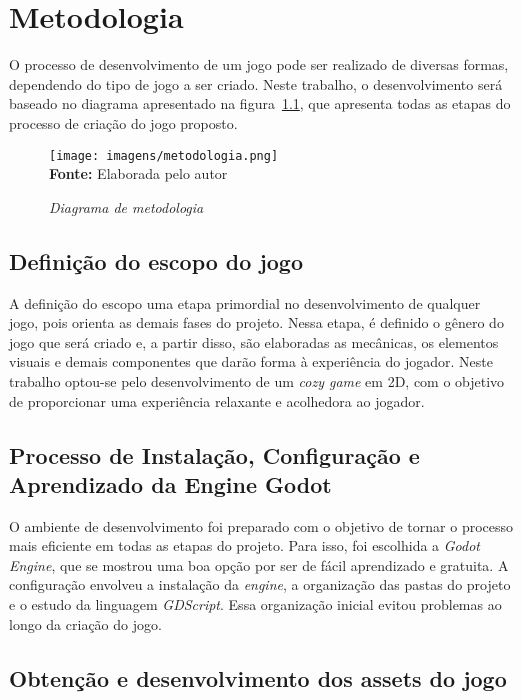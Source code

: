 \chapter{Metodologia}
\label{cap:03}

O processo de desenvolvimento de um jogo pode ser realizado de diversas formas, dependendo do tipo de jogo a ser criado. Neste trabalho, o desenvolvimento será baseado no diagrama apresentado na figura~\ref{fig:metodologia}, que apresenta todas as etapas do processo de criação do jogo proposto.

\FloatBarrier 
\begin{figure}[!htbp]
	\centering
	\caption{\textit{Diagrama de metodologia}}
	\texttt{[image: imagens/metodologia.png]}
	\\\textbf{Fonte:} Elaborada pelo autor
	\label{fig:metodologia}
\end{figure}
\FloatBarrier


\section{Definição do escopo do jogo}

A definição do escopo uma etapa primordial no desenvolvimento de qualquer jogo, pois orienta as demais fases do projeto. Nessa etapa, é definido o gênero do jogo que será criado e, a partir disso, são elaboradas as mecânicas, os elementos visuais e demais componentes que darão forma à experiência do jogador. Neste trabalho optou-se pelo desenvolvimento de um \textit{cozy game} em 2D, com o objetivo de proporcionar uma experiência relaxante e acolhedora ao jogador.	

\section{Processo de Instalação, Configuração e Aprendizado da Engine Godot}

O ambiente de desenvolvimento foi preparado com o objetivo de tornar o processo mais eficiente em todas as etapas do projeto. Para isso, foi escolhida a \textit{Godot Engine}, que se mostrou uma boa opção por ser de fácil aprendizado e gratuita. A configuração envolveu a instalação da \textit{engine}, a organização das pastas do projeto e o estudo da linguagem \textit{GDScript}. Essa organização inicial evitou problemas ao longo da criação do jogo.


\section{Obtenção e desenvolvimento dos assets do jogo}

